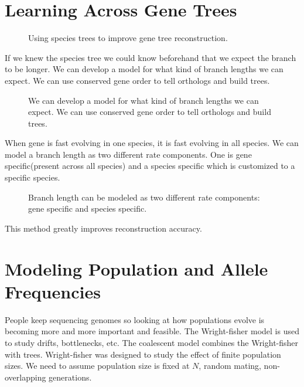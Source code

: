 \section{Learning Across Gene Trees}

\begin{figure}[ht!]
  \centering
  \caption{Using species trees to improve gene tree reconstruction.} 
  \label{Fig10_LearningAcrossGeneTrees}
\end{figure}

If we knew the species tree we could know beforehand that we expect
the branch to be longer. We can develop a model for what kind of
branch lengths we can expect. We can use conserved gene order to tell
orthologs and build trees.

\begin{figure}[ht!]
  \centering
  \caption{We can develop a model for what kind of branch lengths we
    can expect. We can use conserved gene order to tell orthologs and
    build trees.}
  \label{Fig11_DevelopingRatesModel}
\end{figure}

When gene is fast evolving in one species, it is fast evolving in all
species. We can model a branch length as two different rate
components. One is gene specific(present across all species) and a
species specific which is customized to a specific species.

\begin{figure} [ht!] 
  \centering
  \caption{Branch length can be modeled as two different rate
    components: gene specific and species specific.}
  \label{Fig12_UsingRateModels}
\end{figure} 

\noindent This method greatly improves reconstruction accuracy.

\section{Modeling Population and Allele Frequencies}
People keep sequencing genomes so looking at how populations evolve is
becoming more and more important and feasible. The Wright-fisher model
is used to study drifts, bottlenecks, etc. The coalescent model
combines the Wright-fisher with trees. Wright-fisher was designed to
study the effect of finite population sizes. We need to assume
population size is fixed at $N$, random mating, non-overlapping
generations.

